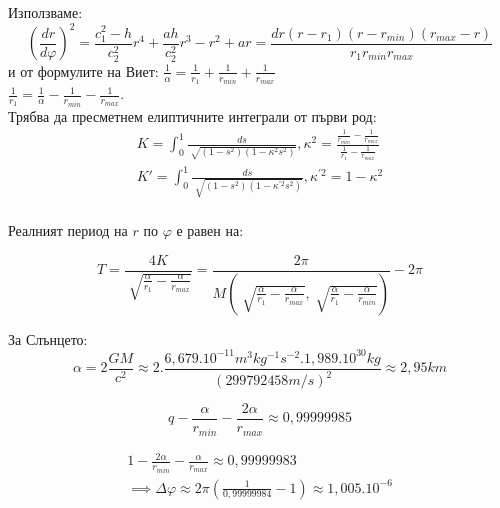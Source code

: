 \documentclass[a4paper,12pt]{article}
\begin{document}
    Използваме: 
    \begin{equation*}
        \left( \frac{dr}{d\varphi} \right)^2 = \frac{c^2_1-h}{c^2_2}r^4 + \frac{ah}{c^2_2}r^3 - r^2+ar = \frac{dr(r-r_1)(r-r_{min})(r_{max}-r)}{r_1r_{min}r_{max}}
    \end{equation*}
    и от формулите на Виет: $\frac{1}{\alpha} = \frac{1}{r_1} + \frac{1}{r_{min}} + \frac{1}{r_{max}}$ \\ 
    $\frac{1}{r_1} = \frac{1}{\alpha} - \frac{1}{r_{min}} - \frac{1}{r_{max}}$.
    \\
    Трябва да пресметнем елиптичните интеграли от първи род: 
    \begin{equation*}
        \begin{aligned}
            K = \int_{0}^{1} \frac{ds}{\sqrt[]{(1-s^2)(1-\kappa^2s^2)}}, \kappa^2 = \frac{\frac{1}{r_{min}} - \frac{1}{r_{max}}}{\frac{1}{r_1} - \frac{1}{r_{max}}} \\
            K' = \int_{0}^{1} \frac{ds}{\sqrt[]{(1-s^2)(1-\kappa^{'2}s^2)}}, \kappa^{'2} = 1-\kappa^2 \\
    \end{aligned}
    \end{equation*}

    Реалният период на $r$ по $\varphi$ е равен на:

    \begin{equation*}
        T = \frac{4K}{\sqrt[]{\frac{\alpha}{r_1} - \frac{\alpha}{r_{max}}}} = \frac{2\pi}{M\left(\sqrt[]{\frac{\alpha}{r_1} - \frac{\alpha}{r_{max}}}, \sqrt[]{\frac{\alpha}{r_1} - \frac{\alpha}{r_{min}}}\right)} - 2\pi
    \end{equation*}

    За Слънцето: 
    \begin{equation*}
        \alpha = 2\frac{GM}{c^2} \approx 2. \frac{6,679.10^{-11}m^3kg^{-1}s^{-2} . 1,989.10^{30}kg}{(299 792 458m/s)^2} \approx 2, 95km
    \end{equation*}

    \begin{equation*}
        q- \frac{\alpha}{r_{min}} - \frac{2\alpha}{r_{max}} \approx 0, 99999985
    \end{equation*}

    \begin{equation*}
        \begin{aligned}
            1 - \frac{2\alpha}{r_{min}} - \frac{\alpha}{r_{max}} \approx 0,99999983 \\
            \implies \varDelta\varphi \approx 2\pi \left( \frac{1}{0,99999984} - 1 \right) \approx 1, 005.10^{-6}
        \end{aligned}
    \end{equation*}
\end{document}
